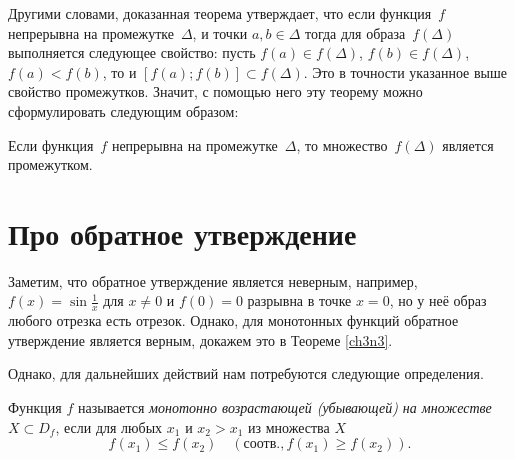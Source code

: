 Другими словами, доказанная теорема утверждает, что если функция~$f$ непрерывна на промежутке~$\Delta$, и точки $a,b\in \Delta$ тогда для образа~$f(\Delta)$ выполняется следующее свойство: пусть $f(a)\in f(\Delta)$, $f(b)\in f(\Delta)$, $f(a)<f(b)$, то и $[f(a);f(b)]\subset f(\Delta)$. Это в точности указанное выше свойство промежутков. Значит, с помощью него эту теорему можно сформулировать следующим образом:	
\begin{thmn}
Если функция~$f$ непрерывна на промежутке~$\Delta$, то множество~$f(\Delta)$ является промежутком.
\end{thmn}

\section{Про обратное утверждение}
Заметим, что обратное утверждение является неверным, например, $f(x)= \sin\frac{1}{x}$ для $x\ne0$ и $f(0) = 0$ разрывна в точке $x = 0$, но у неё образ любого отрезка есть отрезок. Однако, для монотонных функций обратное утверждение является верным, докажем это в Теореме \ref{ch3n3}.

Однако, для дальнейших действий нам потребуются следующие определения.
\begin{defn}
Функция $f$ называется \textit{монотонно возрастающей \textup{(}убывающей) на множестве} $X \subset D_f$, если для любых $x_1$ и $x_2>x_1$ из множества $X$ 
$$
f(x_1)\le f(x_2) \quad (\text{соотв.}, f(x_1)\ge f(x_2)).
$$  
\end{defn}

